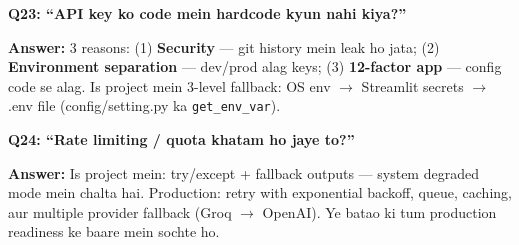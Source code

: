 \begin{interviewbox}
\textbf{Q23: ``API key ko code mein hardcode kyun nahi kiya?''}

\textbf{Answer:} 3 reasons: (1) \textbf{Security} --- git history mein leak ho jata; (2) \textbf{Environment separation} --- dev/prod alag keys; (3) \textbf{12-factor app} --- config code se alag. Is project mein 3-level fallback: OS env $\rightarrow$ Streamlit secrets $\rightarrow$ .env file (config/setting.py ka \texttt{get\_env\_var}).
\end{interviewbox}

\begin{interviewbox}
\textbf{Q24: ``Rate limiting / quota khatam ho jaye to?''}

\textbf{Answer:} Is project mein: try/except + fallback outputs --- system degraded mode mein chalta hai. Production: retry with exponential backoff, queue, caching, aur multiple provider fallback (Groq $\rightarrow$ OpenAI). Ye batao ki tum production readiness ke baare mein sochte ho.
\end{interviewbox}
